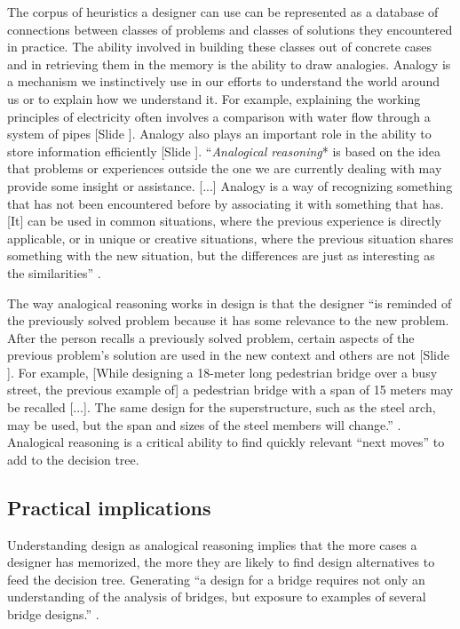 \documentclass{article}
\newcounter{slide}
\begin{document}
The corpus of heuristics a designer can use can be represented as a database of connections between classes of problems and classes of solutions they encountered in practice. The ability involved in building these classes out of concrete cases and in retrieving them in the memory is the ability to draw analogies. Analogy is a mechanism we instinctively use in our efforts to understand the world around us or to explain how we understand it. For example, explaining the working principles of electricity often involves a comparison with water flow through a system of pipes {\color{blue}[Slide ]}. Analogy also plays an important role in the ability to store information efficiently {\color{blue}[Slide ]}. ``\emph{Analogical reasoning}* is based on the idea that problems or experiences outside the one we are currently dealing with may provide some insight or assistance. [...] Analogy is a way of recognizing something that has not been encountered before by associating it with something that has. [It] can be used in common situations, where the previous experience is directly applicable, or in unique or creative situations, where the previous situation shares something with the new situation, but the differences are just as interesting as the similarities'' \cite[p. 1]{maher2014case}. 

The way analogical reasoning works in design is that the designer ``is reminded of the previously solved problem because it has some relevance to the new problem. After the person recalls a previously solved problem, certain aspects of the previous problem's solution are used in the new context and others are not {\color{blue}[Slide ]}. For example, [While designing a 18-meter long pedestrian bridge over a busy street, the previous example of] a pedestrian bridge with a span of 15 meters may be recalled [...]. The same design for the superstructure, such as the steel arch, may be used, but the span and sizes of the steel members will change.'' \cite[p. 1-4]{maher2014case}. Analogical reasoning is a critical ability to find quickly relevant ``next moves'' to add to the decision tree.

\subsection{Practical implications}
\label{sec:Practicalimplicationsone}
Understanding design as analogical reasoning implies that the more cases a designer has memorized, the more they are likely to find design alternatives to feed the decision tree. Generating ``a design for a bridge requires not only an understanding of the analysis of bridges, but exposure to examples of several bridge designs.'' \cite[p. 1]{maher2014case}.
 
\end{document}
